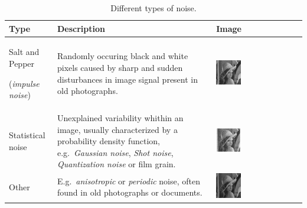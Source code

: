 \begin{table}[p]
{\small
\begin{tabular}{p{8em}p{12em}l}
\toprule
\textbf{Type} & \textbf{Description} & \textbf{Image} \\
\midrule
Salt and Pepper \par (\emph{impulse noise})
&
Randomly occuring black and white pixels caused by sharp and sudden
disturbances in image signal present in old photographs.
&
\includegraphics[width=0.3\textwidth, align=t]{img/preprocessing/noise_saltpepper.png} \\
Statistical noise 
&
Unexplained variability whithin an image, usually characterized by a probability density function, e.g.~\emph{Gaussian noise}, \emph{Shot noise}, \emph{Quantization noise} or film grain.
&
\includegraphics[width=0.3\textwidth, align=t]{img/preprocessing/noise_gaussian.jpg}\\
Other
&
E.g.~\emph{anisotropic} or \emph{periodic} noise, often found in old photographs or documents.
&
\includegraphics[width=0.3\textwidth, align=t]{img/preprocessing/noise_periodic.jpg} \\
\bottomrule
\end{tabular}
}
\caption{Different types of noise.}
\label{tab:types_of_noise}
\end{table}

